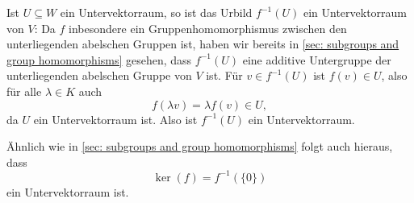 Ist $U \subseteq W$ ein Untervektorraum, so ist das Urbild $f^{-1}(U)$ ein Untervektorraum von $V$: Da $f$ inbesondere ein Gruppenhomomorphismus zwischen den unterliegenden abelschen Gruppen ist, haben wir bereits in \ref{sec: subgroups and group homomorphisms} gesehen, dass $f^{-1}(U)$ eine additive Untergruppe der unterliegenden abelschen Gruppe von $V$ ist. Für $v \in f^{-1}(U)$ ist $f(v) \in U$, also für alle $\lambda \in K$ auch
\[
 f(\lambda v) = \lambda f(v) \in U,
\]
da $U$ ein Untervektorraum ist. Also ist $f^{-1}(U)$ ein Untervektorraum.


\begin{bem}
 Ähnlich wie in \ref{sec: subgroups and group homomorphisms} folgt auch hieraus, dass
 \[
  \ker(f) = f^{-1}(\{0\})
 \]
 ein Untervektorraum ist.
\end{bem}













